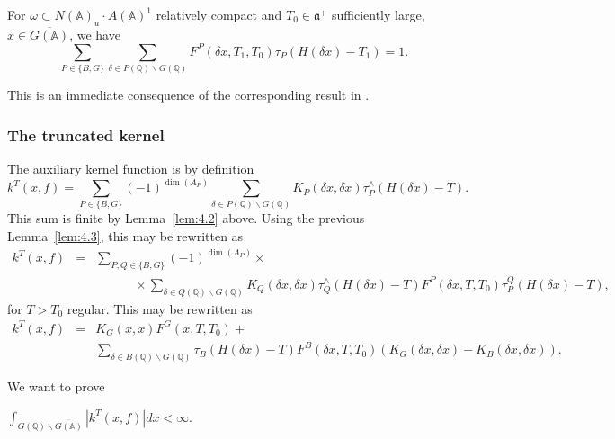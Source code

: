 \begin{lemma}\label{lem:4.3}
For $\omega \subset N({\mathbb{A}})_u\cdot A({\mathbb{A}})^1$ relatively
compact and
$T_0\in {\mathfrak{a}}^{+}$ sufficiently large,
$x\in \overline{G({\mathbb{A}})}$, we
have 
\[
\sum_{P\in \{B,G\}}
\sum_{\delta \in P({\mathbb{Q}})\backslash G({\mathbb{Q}})}
F^P(\delta x,T_1,T_0)\tau _P(H(\delta x)-T_1)=1.
\]
\end{lemma}

This is an immediate consequence of the corresponding result in \cite{A2}.

\subsubsection{The truncated kernel}

The auxiliary kernel function is by definition 
\[
k^T(x,f)=\sum_{P\in \{B,G\}}(-1)^{\dim (A_P)}
\sum_{\delta \in P({\mathbb{Q}})\backslash G({\mathbb{Q}})}
K_P(\delta x,\delta x)\tau _P^{\wedge }(H(\delta x)-T). 
\]
This sum is finite by Lemma~\ref{lem:4.2} above. Using the previous Lemma~\ref{lem:4.3},
this may be rewritten as 
\begin{eqnarray*}
k^T(x,f) &=&\sum_{P,Q\in \{B,G\}}(-1)^{\dim (A_P)}\times \\
&&\;\;\;\;\;\;\;\;\;\;\;\times
\sum_{\delta \in Q({\mathbb{Q}})\backslash G({\mathbb{Q}})}
K_Q(\delta x,\delta x)\tau _Q^{\wedge }(H(\delta x)-T)
F^P(\delta x,T,T_0)\tau _P^Q(H(\delta x)-T),
\end{eqnarray*}
for $T>T_0$ regular. This may be rewritten as
\begin{eqnarray}
k^T(x,f) &=&K_G(x,x)F^G(x,T,T_0)+ \label{eq:4.2}\\
&&\sum_{\delta \in B({\mathbb{Q}})\backslash G({\mathbb{Q}})}
\tau _B(H(\delta x)-T)
F^B(\delta x,T,T_0)(K_G(\delta x,\delta x)-K_B(\delta x,\delta x)). 
\nonumber
\end{eqnarray}

We want to prove

\begin{lemma}\label{lem:4.4}
$\int_{G({\mathbb{Q}})\backslash \overline{G({\mathbb{A}})}}|k^T(x,f)|dx<\infty .$
\end{lemma}

